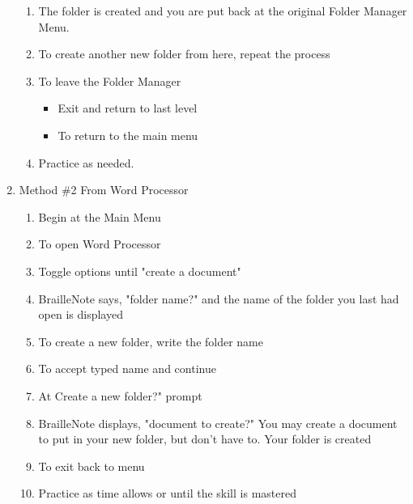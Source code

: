 \documentclass[10pt,letterpaper,twoside]{report}
\begin{document}
\begin{enumerate}
\begin{enumerate}
		      \item The folder is created and you are put back at the original Folder Manager Menu.
		      \item To create another new folder from here, repeat the process
		      \item To leave the Folder Manager
		            \begin{itemize}
			            \item Exit and return to last level 
			            \item To return to the main menu 
		            \end{itemize}
		      \item Practice as needed.
	      \end{enumerate}
	\item Method \#2 From Word Processor
	      \begin{enumerate}
		      \item Begin at the Main Menu 
		      \item To open Word Processor 
		      \item Toggle options until "create a document" 
		      \item BrailleNote says, "folder name?" and the name of the folder you last had open is displayed
		      \item To create a new folder, write the folder name
		      \item To accept typed name and continue 
		      \item At Create a new folder?" prompt 
		      \item BrailleNote displays, "document to create?" You may create a document to put in your new folder, but don't have to. Your folder is created
		      \item To exit back to menu 
		      \item Practice as time allows or until the skill is mastered
	      \end{enumerate}

\end{enumerate}
\end{document}
